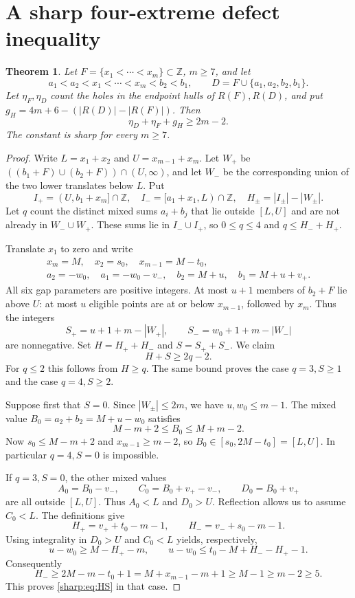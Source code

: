 \documentclass[11pt,a4paper]{article}
\newcommand{\Z}{\mathbb Z}
\newtheorem{theorem}{Theorem}[section]
\begin{document}
\section{A sharp four-extreme defect inequality}\label{sharp}
\begin{theorem}\label{sharp:thm:sharp}
Let $F=\{x_1<\cdots<x_m\}\subset\Z$, $m\ge7$, and let
\[
 a_1<a_2<x_1<\cdots<x_m<b_2<b_1,\qquad
 D=F\cup\{a_1,a_2,b_2,b_1\}.
\]
Let $\eta_F,\eta_D$ count the holes in the endpoint hulls of $R(F),R(D)$,
and put $g_H=4m+6-(|R(D)|-|R(F)|)$. Then
\begin{equation}\label{sharp:eq:sharp}
 \boxed{\eta_D+\eta_F+g_H\ge2m-2.}
\end{equation}
The constant is sharp for every $m\ge7$.
\end{theorem}
\begin{proof}
Write $L=x_1+x_2$ and $U=x_{m-1}+x_m$. Let $W_+$ be
$((b_1+F)\cup(b_2+F))\cap(U,\infty)$, and let $W_-$ be the corresponding
union of the two lower translates below $L$. Put
\[
 I_+=(U,b_1+x_m]\cap\Z,\quad I_-=[a_1+x_1,L)\cap\Z,
 \quad H_\pm=|I_\pm|-|W_\pm|.
\]
Let $q$ count the distinct mixed sums $a_i+b_j$ that lie outside $[L,U]$
and are not already in $W_-\cup W_+$. These sums lie in $I_-\cup I_+$,
so $0\le q\le4$ and $q\le H_-+H_+$.

Translate $x_1$ to zero and write
\[
\begin{gathered}
 x_m=M,\quad x_2=s_0,\quad x_{m-1}=M-t_0,\\
 a_2=-w_0,\quad a_1=-w_0-v_-,\quad
 b_2=M+u,\quad b_1=M+u+v_+.
\end{gathered}
\]
All six gap parameters are positive integers. At most $u+1$ members of
$b_2+F$ lie above $U$: at most $u$ eligible points are at or below
$x_{m-1}$, followed by $x_m$. Thus the integers
\[
 S_+=u+1+m-|W_+|,\qquad S_-=w_0+1+m-|W_-|
\]
are nonnegative. Set $H=H_++H_-$ and $S=S_++S_-$. We claim
\begin{equation}\label{sharp:eq:HS}
 H+S\ge2q-2.
\end{equation}
For $q\le2$ this follows from $H\ge q$. The same bound proves the case
$q=3,S\ge1$ and the case $q=4,S\ge2$.

Suppose first that $S=0$. Since $|W_\pm|\le2m$, we have
$u,w_0\le m-1$. The mixed value $B_0=a_2+b_2=M+u-w_0$ satisfies
\[
 M-m+2\le B_0\le M+m-2.
\]
Now $s_0\le M-m+2$ and $x_{m-1}\ge m-2$, so
$B_0\in[s_0,2M-t_0]=[L,U]$. In particular $q=4,S=0$ is impossible.

If $q=3,S=0$, the other mixed values
\[
 A_0=B_0-v_-,\qquad C_0=B_0+v_+-v_-,\qquad D_0=B_0+v_+
\]
are all outside $[L,U]$. Thus $A_0<L$ and $D_0>U$. Reflection allows us to
assume $C_0<L$. The definitions give
\[
 H_+=v_++t_0-m-1,\qquad H_-=v_-+s_0-m-1.
\]
Using integrality in $D_0>U$ and $C_0<L$ yields, respectively,
\[
 u-w_0\ge M-H_+-m,\qquad
 u-w_0\le t_0-M+H_--H_+-1.
\]
Consequently
\[
 H_-\ge2M-m-t_0+1=M+x_{m-1}-m+1\ge M-1\ge m-2\ge5.
\]
This proves \eqref{sharp:eq:HS} in that case.


\end{proof}
\end{document}
